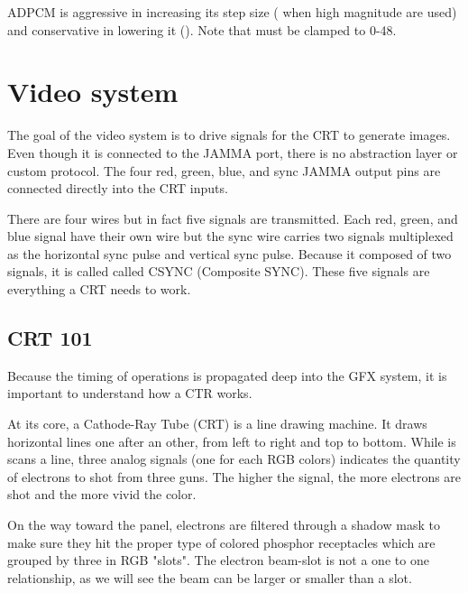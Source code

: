 


ADPCM is aggressive in increasing its step size ( when high magnitude are used) and conservative in lowering it (). Note that  must be clamped to 0-48.










\section{Video system}
The goal of the video system is to drive signals for the CRT to generate images. Even though it is connected to the JAMMA port, there is no abstraction layer or custom protocol. The four red, green, blue, and sync JAMMA output pins are connected directly into the CRT inputs.


There are four wires but in fact five signals are transmitted. Each red, green, and blue signal have their own wire but the sync wire carries two signals multiplexed as the horizontal sync pulse and vertical sync pulse. Because it composed of two signals, it is called called CSYNC (Composite SYNC). 
These five signals are everything a CRT needs to work. 

\subsection{CRT 101}

Because the timing of operations is propagated deep into the GFX system, it is important to understand how a CTR works.

At its core, a Cathode-Ray Tube (CRT) is a line drawing machine. It draws horizontal lines one after an other, from left to right and top to bottom. While is scans a line, three analog signals (one for each RGB colors) indicates the quantity of electrons to shot from three guns. The higher the signal, the more electrons are shot and the more vivid the color.


On the way toward the panel, electrons are filtered through a shadow mask to make sure they hit the proper type of colored phosphor receptacles which are grouped by three in RGB "slots". The electron beam-slot is not a one to one relationship, as we will see the beam can be larger or smaller than a slot.

